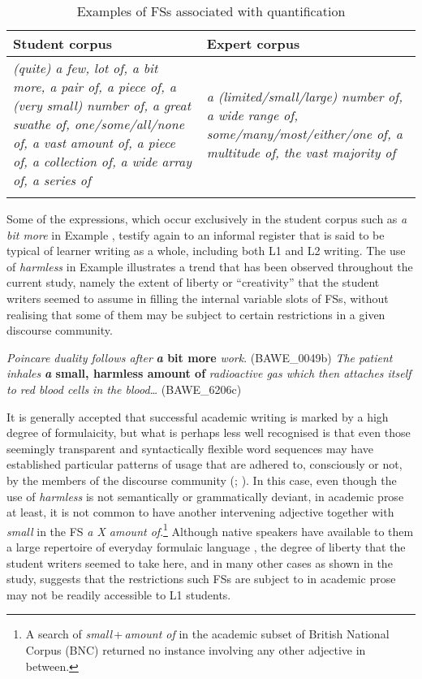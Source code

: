 \documentclass[output=paper]{langscibook}
\begin{document}
\begin{table}
\begin{tabularx}{\textwidth}{QQ}
\lsptoprule
Student corpus & Expert corpus\\\midrule
\textit{(quite) a few, lot of, a bit more, a pair of, a piece of, a (very small) number of, a great swathe of, one/some/all/none of, a vast amount of, a piece of, a collection of, a wide array of, a series of} & \textit{a (limited/small/large) number of, a wide range of, some/many/most/either/one of, a multitude of, the vast majority of}\\
\lspbottomrule
\end{tabularx}
\caption{Examples of FSs associated with quantification\label{tab:wang:10}}
\end{table}

Some of the expressions, which occur exclusively in the student corpus such as \textit{a bit more} in Example , testify again to an informal register that is said to be typical of learner writing as a whole, including both L1 and L2 writing. The use of \textit{harmless} in Example  illustrates a trend that has been observed throughout the current study, namely the extent of liberty or ``creativity'' that the student writers seemed to assume in filling the internal variable slots of FSs, without realising that some of them may be subject to certain restrictions in a given discourse community. 

\ea \textit{Poincare duality follows after} \textbf{\textit{a} \textbf{bit} \textbf{more}} \textit{work}. (BAWE\_0049b)
\ex \textit{The patient inhales} \textbf{\textit{a} \textbf{small,} \textbf{harmless} \textbf{amount} \textbf{of}} \textit{radioactive gas which then attaches itself to red blood cells in the blood…} (BAWE\_6206c)
\z

It is generally accepted that successful academic writing is marked by a high degree of formulaicity, but what is perhaps less well recognised is that even those seemingly transparent and syntactically flexible word sequences may have established particular patterns of usage that are adhered to, consciously or not, by the members of the discourse community (\citealt{Pérez-Llantada2014}; \citealt{Wang2018}). In this case, even though the use of \textit{harmless} is not semantically or grammatically deviant, in academic prose at least, it is not common to have another intervening adjective together with \textit{small} in the FS \textit{a X amount of}.\footnote{A search of \textit{small}\,+\,\textit{amount of} in the academic subset of British National Corpus (BNC) returned no instance involving any other adjective in between.} Although native speakers have available to them a large repertoire of everyday formulaic language \citep{Sinclair1991}, the degree of liberty that the student writers seemed to take here, and in many other cases as shown in the study, suggests that the restrictions such FSs are subject to in academic prose may not be readily accessible to L1 students.
\end{document}
